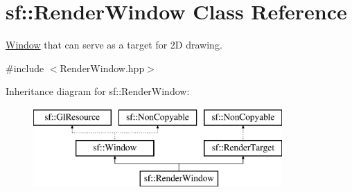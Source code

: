 \hypertarget{classsf_1_1_render_window}{}\section{sf\+:\+:Render\+Window Class Reference}
\label{classsf_1_1_render_window}


\hyperlink{classsf_1_1_window}{Window} that can serve as a target for 2D drawing.  




{\ttfamily \#include $<$Render\+Window.\+hpp$>$}

Inheritance diagram for sf\+:\+:Render\+Window\+:\begin{figure}[H]
\begin{center}
\leavevmode
\includegraphics[height=3.000000cm]{classsf_1_1_render_window}
\end{center}
\end{figure}
